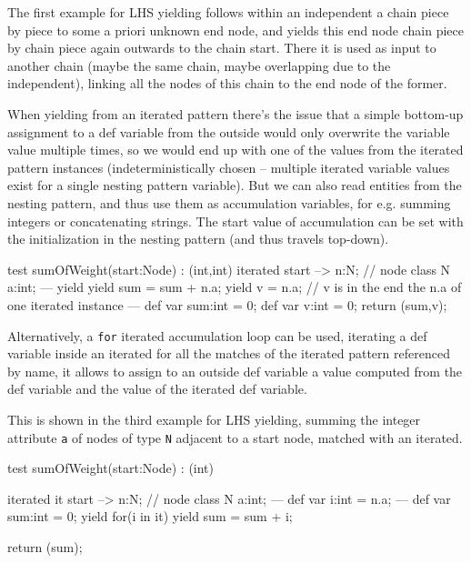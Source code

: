 The first example for LHS yielding follows within an independent a chain piece by piece to some a priori unknown end node, and yields this end node chain piece by chain piece again outwards to the chain start. There it is used as input to another chain (maybe the same chain, maybe overlapping due to the independent), linking all the nodes of this chain to the end node of the former.

When yielding from an iterated pattern there's the issue that a simple bottom-up assignment to a def variable from the outside would only overwrite the variable value multiple times, so we would end up with one of the values from the iterated pattern instances (indeterministically chosen -- multiple iterated variable values exist for a single nesting pattern variable).
But we can also read entities from the nesting pattern, and thus use them as accumulation variables, for e.g. summing integers or concatenating strings.
The start value of accumulation can be set with the initialization in the nesting pattern (and thus travels top-down).

\begin{example}
  \begin{grgen}
test sumOfWeight(start:Node) : (int,int)
{
  iterated {
    start --> n:N; // node class N { a:int; }
  ---
    yield {
      yield sum = sum + n.a;
      yield v = n.a; // v is in the end the n.a of one iterated instance
    }
  } 
---
  def var sum:int = 0;
  def var v:int = 0;
  return (sum,v);
}
  \end{grgen}
\end{example}

Alternatively, a \texttt{for} iterated accumulation loop can be used, iterating a def variable inside an iterated for all the matches of the iterated pattern referenced by name, it allows to assign to an outside def variable a value computed from the def variable and the value of the iterated def variable.

This is shown in the third example for LHS yielding, summing the integer attribute \texttt{a} of nodes of type \texttt{N} adjacent to a start node, matched with an iterated.

\begin{example}
  \begin{grgen}
test sumOfWeight(start:Node) : (int)
{
  iterated it {
    start --> n:N; // node class N { a:int; }
  ---
    def var i:int = n.a;
  } 
---
  def var sum:int = 0;
  yield {
    for(i in it)
    {
      yield sum = sum + i;
    }
  }

  return (sum);
}
  \end{grgen}
\end{example}


